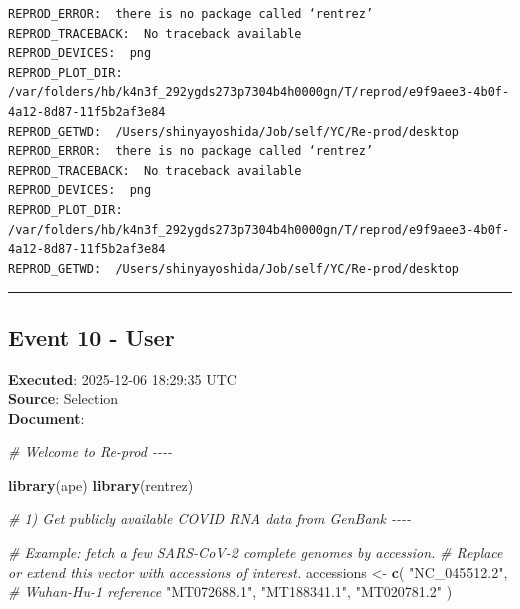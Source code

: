 \documentclass[
  11pt,
]{article}
\newenvironment{Shaded}{\begin{snugshade}}{\end{snugshade}}
\newcommand{\CommentTok}[1]{\textcolor[rgb]{0.56,0.35,0.01}{\textit{#1}}}
\newcommand{\FunctionTok}[1]{\textcolor[rgb]{0.13,0.29,0.53}{\textbf{#1}}}
\newcommand{\NormalTok}[1]{#1}
\newcommand{\OtherTok}[1]{\textcolor[rgb]{0.56,0.35,0.01}{#1}}
\newcommand{\StringTok}[1]{\textcolor[rgb]{0.31,0.60,0.02}{#1}}
\newenvironment{rpoutput}{\vspace{0.5em}\begin{snugshade}}{\end{snugshade}}
\begin{document}
\begin{rpoutput}

\begin{verbatim}
REPROD_ERROR:  there is no package called ‘rentrez’ 
REPROD_TRACEBACK:  No traceback available  
REPROD_DEVICES:  png 
REPROD_PLOT_DIR:  /var/folders/hb/k4n3f_292ygds273p7304b4h0000gn/T/reprod/e9f9aee3-4b0f-4a12-8d87-11f5b2af3e84 
REPROD_GETWD:  /Users/shinyayoshida/Job/self/YC/Re-prod/desktop 
REPROD_ERROR:  there is no package called ‘rentrez’ 
REPROD_TRACEBACK:  No traceback available  
REPROD_DEVICES:  png 
REPROD_PLOT_DIR:  /var/folders/hb/k4n3f_292ygds273p7304b4h0000gn/T/reprod/e9f9aee3-4b0f-4a12-8d87-11f5b2af3e84 
REPROD_GETWD:  /Users/shinyayoshida/Job/self/YC/Re-prod/desktop 
\end{verbatim}

\end{rpoutput}

\begin{center}\rule{0.5\linewidth}{0.5pt}\end{center}

\subsection{Event 10 - User}\label{event-10---user}

\textbf{Executed}: 2025-12-06 18:29:35 UTC\\
\textbf{Source}: Selection\\
\textbf{Document}:

\begin{Shaded}
\begin{Highlighting}[]
\CommentTok{\# Welcome to Re{-}prod {-}{-}{-}{-}}

\FunctionTok{library}\NormalTok{(ape)}
\FunctionTok{library}\NormalTok{(rentrez)}

\CommentTok{\# 1) Get publicly available COVID RNA data from GenBank {-}{-}{-}{-}}

\CommentTok{\# Example: fetch a few SARS{-}CoV{-}2 complete genomes by accession.}
\CommentTok{\# Replace or extend this vector with accessions of interest.}
\NormalTok{accessions }\OtherTok{\textless{}{-}} \FunctionTok{c}\NormalTok{(}
  \StringTok{"NC\_045512.2"}\NormalTok{, }\CommentTok{\# Wuhan{-}Hu{-}1 reference}
  \StringTok{"MT072688.1"}\NormalTok{,}
  \StringTok{"MT188341.1"}\NormalTok{,}
  \StringTok{"MT020781.2"}
\NormalTok{)}
\end{Highlighting}
\end{Shaded}
\end{document}
